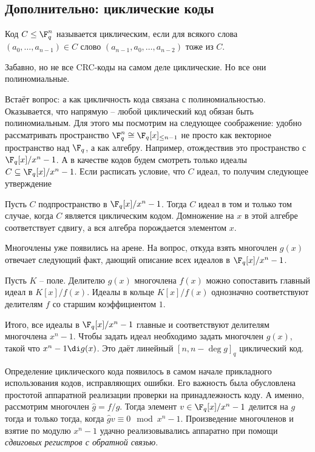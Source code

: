 \subsection{Дополнительно:  циклические коды}

\dfn Код $C\leq \F_q^n$ называется циклическим, если для всякого слова $(a_0,\dots,a_{n-1})\in C$ слово $(a_{n-1},a_0,\dots,a_{n-2})$ тоже из $C$. 
\edfn

\rm Забавно, но не все CRC-коды на самом деле циклические. Но все они полиномиальные.
\erm


Встаёт вопрос: а как цикличность кода связана с полиномиальностью. Оказывается, что напрямую -- любой циклический код обязан быть полиномиальным. Для этого мы посмотрим на следующее соображение: удобно рассматривать пространство $\F_q^n \cong \F_q[x]_{\leq n-1}$ не просто как векторное пространство над $\F_q$, а как алгебру. Например, отождествив это пространство с $\F_q[x]/x^n-1$. А в качестве кодов будем смотреть только идеалы $C \subseteq \F_q[x]/x^n-1$. Если расписать условие, что $C$ идеал, то получим следующее утверждение

\thrm Пусть $C$ подпространство в $\F_q[x]/x^n-1$. Тогда $C$ идеал в том и только том случае, когда $C$ является циклическим кодом.
\ethrm
\proof Домножение на $x$ в этой алгебре соответствует сдвигу, а вся алгебра порождается элементом $x$.
\endproof

Многочлены уже появились на арене. На вопрос, откуда взять многочлен $g(x)$ отвечает следующий факт, дающий описание всех идеалов в $\F_q[x]/x^n-1$.

\fct Пусть $K$ -- поле. Делителю $g(x)$ многочлена $f(x)$ можно сопоставить главный идеал в $K[x]/f(x)$. Идеалы в кольце $K[x]/f(x)$ однозначно соответствуют делителям $f$ со старшим коэффициентом $1$.
\efct

Итого, все идеалы в $\F_q[x]/x^n-1$ главные и соответствуют делителям многочлена $x^n-1$. Чтобы задать идеал необходимо задать многочлен $g(x)$, такой что $ x^n-1 \di g(x)$. Это даёт линейный $[n, n-\deg g]_q$ циклический код.

Определение циклического кода появилось в самом начале прикладного использования кодов, исправляющих ошибки. Его важность была обусловлена простотой аппаратной реализации проверки на принадлежность коду. А именно, рассмотрим многочлен $\hat{g}=f/g$. Тогда элемент $v \in \F_q[x]/x^n-1$ делится на $g$ тогда и только тогда, когда $\hat g v \equiv 0 \mod x^n-1$. 
Произведение многочленов и взятие по модулю $x^n-1$ удачно реализовывались аппаратно при помощи {\it сдвиговых регистров с обратной связью}.



